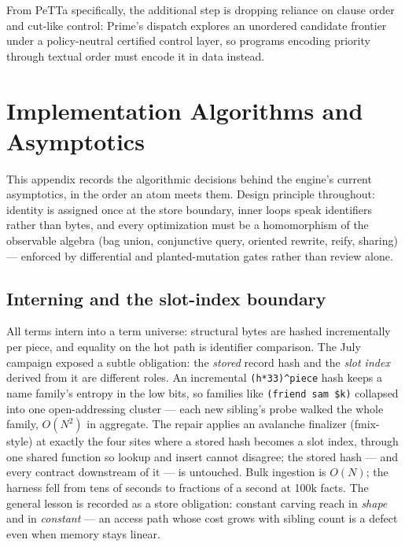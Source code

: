\documentclass[11pt]{article}
\newcommand{\code}[1]{\texttt{#1}}
\newcommand{\PeTTa}{\textup{PeTTa}}
\begin{document}
From \PeTTa{} specifically, the additional step is dropping reliance on
clause order and cut-like control: Prime's dispatch explores an
unordered candidate frontier under a policy-neutral certified control
layer, so programs encoding priority through textual order must encode
it in data instead.


\section{Implementation Algorithms and Asymptotics}
\label{app:algorithms}

This appendix records the algorithmic decisions behind the engine's
current asymptotics, in the order an atom meets them.  Design principle
throughout: identity is assigned once at the store boundary, inner loops
speak identifiers rather than bytes, and every optimization must be a
homomorphism of the observable algebra (bag union, conjunctive query,
oriented rewrite, reify, sharing) --- enforced by differential and
planted-mutation gates rather than review alone.

\subsection{Interning and the slot-index boundary}

All terms intern into a term universe: structural bytes are hashed
incrementally per piece, and equality on the hot path is identifier
comparison.  The July campaign exposed a subtle obligation: the
\emph{stored} record hash and the \emph{slot index} derived from it are
different roles.  An incremental \code{(h*33)\^{}piece} hash keeps a
name family's entropy in the low bits, so families like
\code{(friend sam \$k)} collapsed into one open-addressing cluster ---
each new sibling's probe walked the whole family, $O(N^2)$ in
aggregate.  The repair applies an avalanche finalizer (fmix-style) at
exactly the four sites where a stored hash becomes a slot index,
through one shared function so lookup and insert cannot disagree; the
stored hash --- and every contract downstream of it --- is untouched.
Bulk ingestion is $O(N)$; the harness fell from tens of seconds to
fractions of a second at 100k facts.  The general lesson is recorded as
a store obligation: constant carving reach in \emph{shape} and in
\emph{constant} --- an access path whose cost grows with sibling count
is a defect even when memory stays linear.
\end{document}
